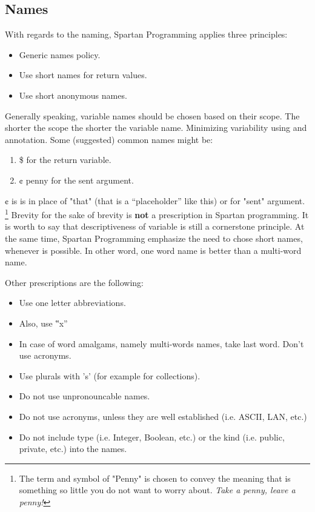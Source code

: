 \subsection{Names}
With regards to the naming, Spartan Programming applies three principles:
\begin{itemize}
 \item Generic names policy.
 \item Use short names for return values.
 \item Use short anonymous names.
\end{itemize}
Generally speaking, variable names should be chosen based on their scope.
The shorter the scope the shorter the variable name.
Minimizing variability using  and  annotation. 
Some (suggested) common names might be:
\begin{enumerate}
  \item \$ for the return variable.
  \item ¢ penny for the sent argument.
\end{enumerate}
¢ is is in place of "that" (that is a ``placeholder'' like this) or for "sent" argument.
\footnote{The term and symbol of "Penny" is chosen to convey the meaning that is something so little you do not want to worry about.
\emph{Take a penny, leave a penny!}}
Brevity for the sake of brevity is \textbf{not} a prescription in Spartan programming. 
It is worth to say that descriptiveness of variable is still a cornerstone principle. 
At the same time, Spartan Programming emphasize the need to chose short names, whenever is possible.
In other word, one word name is better than a multi-word name.

Other prescriptions are the following:
\begin{itemize}
 \item Use one letter abbreviations.
 \item Also, use ‟x”
 \item In case of word amalgams, namely multi-words names, take last word. Don't use acronyms.
 \item Use plurals with 's' (for example for collections).
 \item Do not use unpronouncable names.
 \item Do not use acronyms, unless they are well established (i.e. ASCII, LAN, etc.)
 \item Do not include type (i.e. Integer, Boolean, etc.) or the kind (i.e. public, private, etc.) into the names.
\end{itemize}

